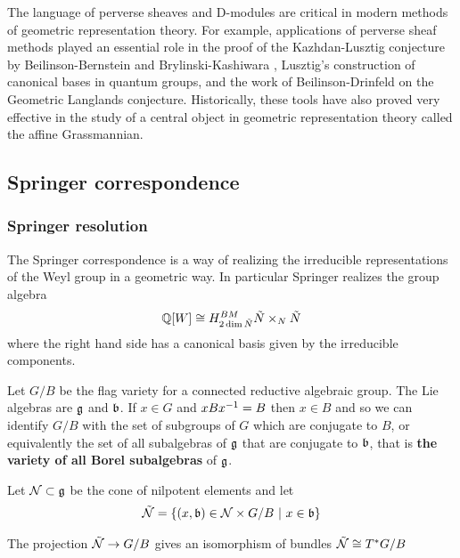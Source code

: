 The language of perverse sheaves and D-modules are critical 
in modern methods of geometric representation theory. 
For example, applications of perverse sheaf methods played an essential
 role in the proof of the Kazhdan-Lusztig conjecture
 by Beilinson-Bernstein and Brylinski-Kashiwara
, Lusztig’s construction of canonical bases in quantum groups, and the work of Beilinson-Drinfeld on 
the Geometric Langlands conjecture. 
Historically, these tools have also proved very effective in the study of a 
central object in geometric representation theory called the affine Grassmannian. 

\subsection{Springer correspondence}
\subsubsection{Springer resolution}
The Springer correspondence is a way of realizing 
the irreducible representations of the Weyl group in a geometric way. In particular 
Springer realizes the group algebra \begin{align*}
    \mathbb{Q}[W] \cong H^{BM}_{2\dim \tilde N}{\tilde N\times_N \tilde N}
\end{align*} where the right hand side 
has a canonical basis given by the irreducible components.

\hfill

Let $G/B$ be the flag variety for a connected reductive algebraic group. 
The Lie algebras are $\mathfrak{g}$ and $\mathfrak{b}$. If $x\in G$ and $xB{x}^{-1} = B$ 
then $x\in B$ and so we can identify $G/B$ with the set of subgroups of $G$
which are conjugate to $B$, or equivalently the set of all subalgebras of $\mathfrak{g}$
that are conjugate to $\mathfrak{b}$, that is \textbf{the variety of all Borel subalgebras} of $\mathfrak{g}$.

\hfill

Let ${\mathcal{N}}\subset \mathfrak{g}$ be 
the cone of nilpotent elements and let \begin{align*}
    \tilde {{\mathcal{N}}} = \{(x,\mathfrak{b})\in {\mathcal{N}}\times G/B \ \vert \  x\in \mathfrak{b}\}
\end{align*}

\begin{lemma}
    The projection $\tilde {{\mathcal{N}}} \to G/B$ gives an isomorphism of bundles $\tilde {{\mathcal{N}}} \cong T^*G/B$
\end{lemma}

